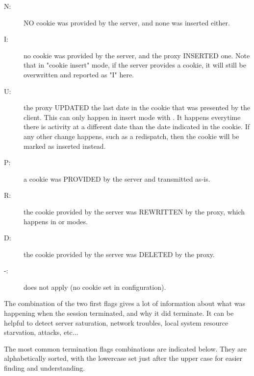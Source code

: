 \begin{itemize}
        \begin{description}
        \item[N:]
            NO cookie was provided by the server, and none was inserted either.
        \item[I:]
            no cookie was provided by the server, and the proxy INSERTED one.
            Note that in "cookie insert" mode, if the server provides a cookie,
            it will still be overwritten and reported as "I" here.
        \item[U:]
            the proxy UPDATED the last date in the cookie that was presented by
            the client. This can only happen in insert mode with . It
            happens everytime there is activity at a different date than the
            date indicated in the cookie. If any other change happens, such as
            a redispatch, then the cookie will be marked as inserted instead.
        \item[P:]
            a cookie was PROVIDED by the server and transmitted as-is.
        \item[R:]
            the cookie provided by the server was REWRITTEN by the proxy, which
            happens in  or  modes.
        \item[D:]
            the cookie provided by the server was DELETED by the proxy.
        \item[-:]
            does not apply (no cookie set in configuration).
        \end{description}
\end{itemize}

The combination of the two first flags gives a lot of information about what
was happening when the session terminated, and why it did terminate. It can be
helpful to detect server saturation, network troubles, local system resource
starvation, attacks, etc...

The most common termination flags combinations are indicated below. They are
alphabetically sorted, with the lowercase set just after the upper case for
easier finding and understanding.

